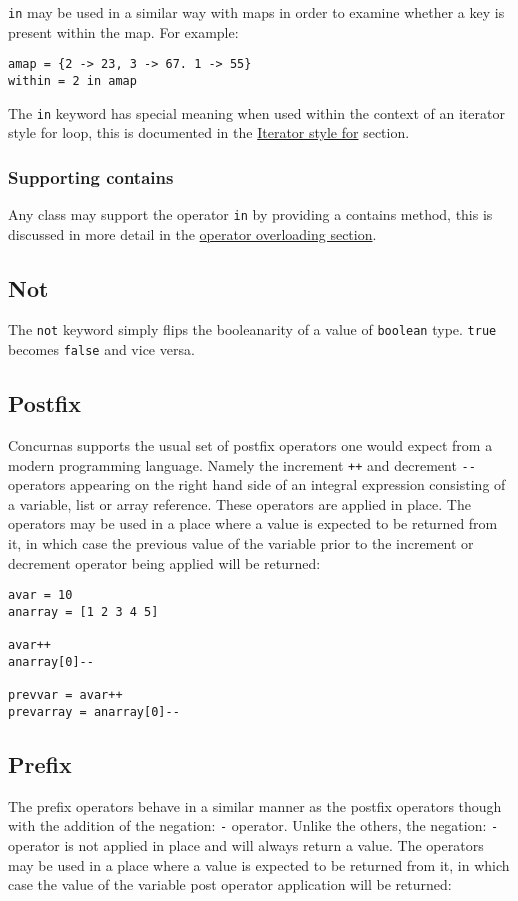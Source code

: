 \documentclass[conc-doc]{subfiles}
\begin{document}
\lstinline{in} may be used in a similar way with maps in order to examine whether a key is present within the map. For example:

\begin{lstlisting}
amap = {2 -> 23, 3 -> 67. 1 -> 55}
within = 2 in amap
\end{lstlisting}

The \lstinline{in} keyword has special meaning when used within the context of an iterator style for loop, this is documented in the \hyperref[subsec:IteratorStyleFor]{Iterator style for} section.

\subsubsection{Supporting contains}
Any class may support the operator \lstinline{in} by providing a contains method, this is discussed in more detail in the \hyperref[sec:OperatorOverloading]{operator overloading section}.

\subsection{Not}
The \lstinline{not} keyword simply flips the booleanarity of a value of \lstinline{boolean} type. \lstinline{true} becomes \lstinline{false} and vice versa.

\subsection{Postfix}
Concurnas supports the usual set of postfix operators one would expect from a modern programming language. Namely the increment \lstinline{++} and decrement \lstinline{--} operators appearing on the right hand side of an integral expression consisting of a variable, list or array reference. These operators are applied in place. The operators may be used in a place where a value is expected to be returned from it, in which case the previous value of the variable prior to the increment or decrement operator being applied will be returned:

\begin{lstlisting}
avar = 10
anarray = [1 2 3 4 5]

avar++
anarray[0]--

prevvar = avar++
prevarray = anarray[0]--
\end{lstlisting}

\subsection{Prefix}
The prefix operators behave in a similar manner as the postfix operators though with the addition of the negation: \lstinline{-} operator. Unlike the others, the negation: \lstinline{-} operator is not applied in place and will always return a value. The operators may be used in a place where a value is expected to be returned from it, in which case the value of the variable post operator application will be returned:
\end{document}
